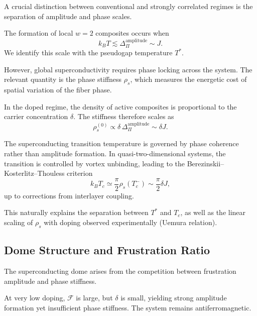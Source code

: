     A crucial distinction between conventional and strongly correlated regimes
    is the separation of amplitude and phase scales.

    The formation of local $w=2$ composites
    occurs when
    \begin{equation}
      k_B T
      \lesssim
      \Delta_\Pi^{\mathrm{amplitude}}
      \sim
      J .
    \end{equation}
    We identify this scale with the pseudogap temperature $T^*$.

    However,
    global superconductivity requires
    phase locking across the system.
    The relevant quantity is the phase stiffness $\rho_s$,
    which measures the energetic cost
    of spatial variation of the fiber phase.

    In the doped regime,
    the density of active composites
    is proportional to the carrier concentration $\delta$.
    The stiffness therefore scales as
    \begin{equation}
      \rho_s^{(0)}
      \propto
      \delta \,
      \Delta_\Pi^{\mathrm{amplitude}}
      \sim
      \delta J .
      \label{eq:stiffness-scaling}
    \end{equation}

    The superconducting transition temperature
    is governed by phase coherence rather than amplitude formation.
    In quasi-two-dimensional systems,
    the transition is controlled by vortex unbinding,
    leading to the Berezinskii--Kosterlitz--Thouless criterion
    \begin{equation}
      k_B T_c
      \simeq
      \frac{\pi}{2}
      \rho_s(T_c^-)
      \sim
      \frac{\pi}{2}
      \delta J ,
      \label{eq:tc-deltaJ}
    \end{equation}
    up to corrections from interlayer coupling.

    This naturally explains the separation
    between $T^*$ and $T_c$,
    as well as the linear scaling of $\rho_s$
    with doping observed experimentally
    (Uemura relation).

  \subsection{Dome Structure and Frustration Ratio}
    \label{subsec:dome-structure}

    The superconducting dome arises
    from the competition between
    frustration amplitude and phase stiffness.

    At very low doping,
    $\mathcal{F}$ is large,
    but $\delta$ is small,
    yielding strong amplitude formation
    yet insufficient phase stiffness.
    The system remains antiferromagnetic.

